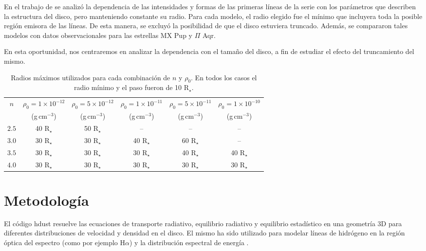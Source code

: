\documentclass[baaa]{baaa}
\begin{document}
En el trabajo de \citet{Cochetti2023} se analiz\'o la dependencia de las intensidades y formas de las primeras l\'ineas de la serie con los par\'ametros que describen la estructura del disco, pero manteniendo constante su radio. Para cada modelo, el radio elegido fue el mínimo que incluyera toda la posible región emisora de las líneas. De esta manera, se excluyó la posibilidad de que el disco estuviera truncado. Adem\'as,  se compararon tales  modelos con datos observacionales para las estrellas MX Pup y $\Pi$ Aqr. 

En esta oportunidad, nos centraremos en analizar la dependencia con el tama\~no del disco, a fin de estudiar el efecto del truncamiento del mismo. 

\begin{table*}[!t]
\centering
\caption{Radios máximos utilizados para cada combinaci\'on de $n$ y $\rho_0$. En todos los casos el radio m\'inimo y el paso fueron de 10 R$_\star$. }
\begin{tabular}{cccccc}
\hline\hline\noalign{\smallskip}
$n$  	& $\rho_0=1\times10^{-12}$	& $\rho_0=5\times10^{-12}$	& $\rho_0=1\times10^{-11}$ & $\rho_0=5\times10^{-11}$ & $\rho_0=1\times10^{-10}$\\
 & (g\,cm$^{-3}$) & (g\,cm$^{-3}$) & (g\,cm$^{-3}$) & (g\,cm$^{-3}$) &(g\,cm$^{-3}$) \\
\hline\noalign{\smallskip}
$2.5$ & 40 R$_\star$ & 50 R$_\star$ & --   & --  & --  \\
$3.0$ & 30 R$_\star$ & 30 R$_\star$ & 40 R$_\star$ & 60 R$_\star$ & --  \\
$3.5$ & 30 R$_\star$ & 30 R$_\star$ & 30 R$_\star$ & 40 R$_\star$ & 40 R$_\star$\\
$4.0$ & 30 R$_\star$ & 30 R$_\star$ & 30 R$_\star$ & 30 R$_\star$ & 30 R$_\star$\\
\hline
\end{tabular}
\label{models}
\end{table*}

\section{Metodolog\'ia}

El c\'odigo {\sc hdust} resuelve las ecuaciones de transporte radiativo, equilibrio radiativo y equilibrio estad\'istico en una geometr\'ia 3D para diferentes distribuciones de velocidad y densidad en el disco. El mismo ha sido utilizado para modelar líneas de hidrógeno en la regi\'on \'optica del espectro (como por ejemplo H$\alpha$) y la distribuci\'on espectral de energ\'ia \citep{Klement2017,Marr2021}.
\end{document}
